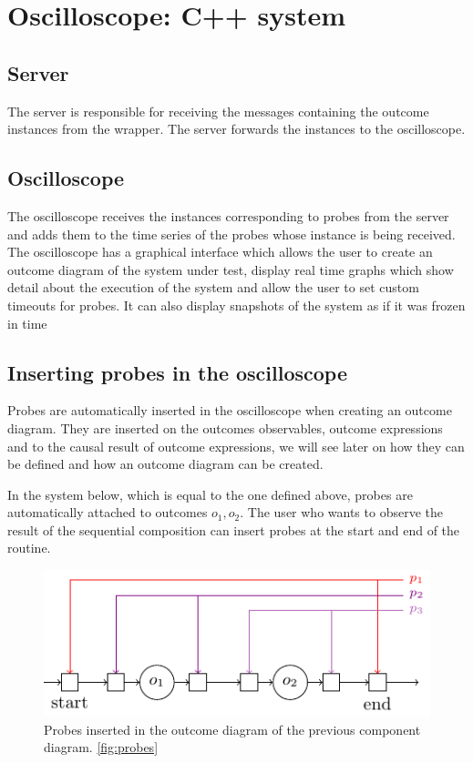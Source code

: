 \section{Oscilloscope: C++ system}
    \subsection{Server} The server is responsible for receiving the messages containing the outcome instances from the wrapper. The server forwards the instances to the oscilloscope.
    
    \subsection{Oscilloscope} The oscilloscope receives the instances corresponding to probes from the server and adds them to the time series of the probes whose instance is being received. 
    The oscilloscope has a graphical interface which allows the user to create an outcome diagram of the system under test, display real time graphs which show detail about the execution of the system and allow the user to set custom timeouts for probes. It can also display snapshots of the system as if it was frozen in time
 

    \subsection{Inserting probes in the oscilloscope}
        Probes are automatically inserted in the oscilloscope when creating an outcome diagram. They are inserted on the outcomes observables, outcome expressions and to the causal result of outcome expressions, we will see later on how they can be defined and how an outcome diagram can be created. 
        
        In the system below, which is equal to the one defined above, probes are automatically attached to outcomes $o_1, o_2$. The user who wants to observe the result of the sequential composition can insert probes at the start and end of the routine. 

        \begin{figure}[H]
            \begin{center}
                \includegraphics[scale=1.3]{tikz/probe_1.pdf}
            \end{center}
            \label{fig:probes_o}
            \caption{Probes inserted in the outcome diagram of the previous component diagram. \cref{fig:probes}}
        \end{figure}
       
